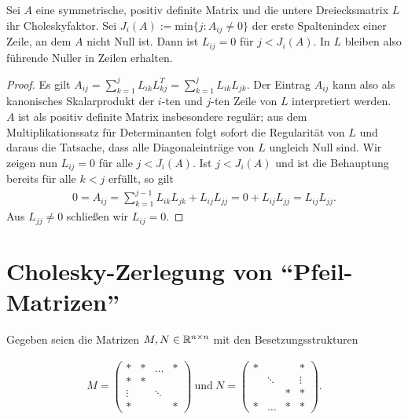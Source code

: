 \begin{lemma}
Sei $A$ eine symmetrische, positiv definite Matrix und die untere Dreiecksmatrix $L$ ihr Choleskyfaktor. Sei $J_i(A) := \mathrm{min}\{ j: A_{ij} \neq 0 \}$ der erste Spaltenindex einer Zeile, an dem $A$ nicht Null ist. Dann ist $L_{ij} = 0$ für $j < J_i(A)$. In $L$ bleiben also führende Nuller in Zeilen erhalten.
\end{lemma}

\begin{proof}
Es gilt $A_{ij} = \sum_{k=1}^j L_{ik} L_{kj}^T
= \sum_{k=1}^j L_{ik} L_{jk}$. Der Eintrag $A_{ij}$ kann also als kanonisches Skalarprodukt der $i$-ten und $j$-ten Zeile von $L$ interpretiert werden. $A$ ist als positiv definite Matrix insbesondere regulär; aus dem Multiplikationssatz für Determinanten folgt sofort die Regularität von $L$ und daraus die Tatsache, dass alle Diagonaleinträge von $L$ ungleich Null sind. Wir zeigen nun $L_{ij} = 0$ für alle $j < J_i(A)$.
Ist $j < J_i(A)$ und ist die Behauptung bereits für alle $k < j$ erfüllt, so gilt
\begin{align*}
0 = A_{ij} = \sum_{k=1}^{j-1} L_{ik} L_{jk} + L_{ij} L_{jj} = 0 + L_{ij} L_{jj} = L_{ij} L_{jj}.
\end{align*}
Aus $L_{jj} \neq 0$ schließen wir $L_{ij} = 0$.
\end{proof}

\section{Cholesky-Zerlegung von "`Pfeil-Matrizen"'}

Gegeben seien die Matrizen $M,N \in \mathbb{R}^{n \times n}$ mit den Besetzungsstrukturen

\begin{align*}
    M =
\left(\begin{array}{cccccc}
                \ast & \ast & \hdots & \ast \\
                \ast & \ast && \\
                \vdots && \ddots & \\
                \ast &&& \ast
      \end{array}
\right)
\mathrm{~und~}
    N =
\left(\begin{array}{cccccc}
                \ast &&& \ast \\
                & \ddots && \vdots \\
                && \ast & \ast \\
                \ast & \hdots & \ast & \ast
      \end{array}
\right).
\end{align*}

